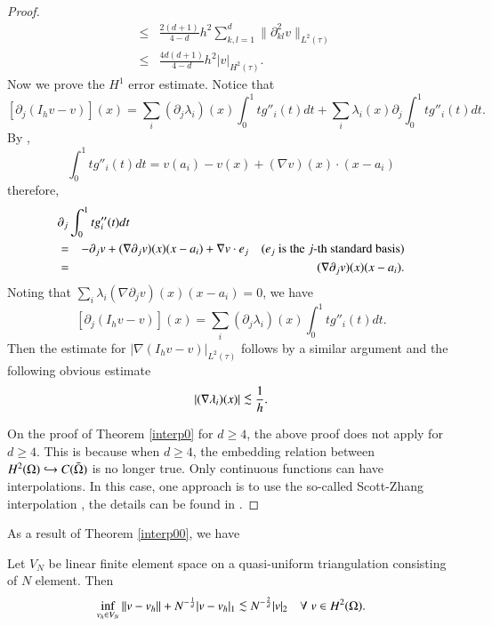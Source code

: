 \begin{proof}
\begin{eqnarray*}
&\le&\frac{2(d+1)}{4-d}h^2
\sum_{k,l=1}^d\|\partial^2_{kl}v\|_{L^2(\tau)}\\
&\le&\frac{4d(d+1)}{4-d}h^2|v|_{H^2(\tau)}.
\end{eqnarray*}
Now we prove the $H^1$ error estimate. Notice that
$$
[\partial_{j}( I_{h} v - v)](x) = \sum_{i} (\partial_{j} \lambda_{i} )(x) \int_{0}^{1} t g''_{i}(t) dt + \sum_{i} \lambda_{i}(x) \partial_{j} \int_{0}^{1} t g''_{i}(t) dt.
$$ 
By ,
$$
\int_0^1tg''_i(t)dt = v(a_i) - v(x) + (\nabla v)(x)\cdot (x-a_i)
$$
therefore,
\begin{eqnarray*}
\lefteqn{\partial_{j} \int_0^1tg''_i(t)dt} \\
& = & - \partial_{j} v + (\nabla \partial_{j} v )(x) (x - a_{i}) + \nabla v \cdot e_{j} 
\hcomment{$e_{j}$ is the $j$-th standard basis}  \\
& = & (\nabla \partial_{j} v )(x) (x - a_{i}).
\end{eqnarray*}
Noting that $\sum_{i} \lambda_{i}( \nabla \partial_{j} v )(x) (x - a_{i}) = 0$, we have
$$
[\partial_{j}( I_{h} v - v)](x) = \sum_{i} (\partial_{j} \lambda_{i} )(x) \int_{0}^{1} t g''_{i}(t) dt.
$$
Then the estimate for $|\nabla(I_hv-v)|_{L^2(\tau)}$
follows by a similar argument and the following obvious
estimate
$$
|(\nabla\lambda_i)(x)|\lc\frac{1}{h}.
$$
 
On the proof of Theorem \ref{interp0} for $d\ge 4$, the above proof does not
apply for $d \ge 4$. This is because when $d \ge 4$, the embedding
relation between $H^{2}(\Omega) \hookrightarrow C(\bar{\Omega})$ is no longer true.  Only
continuous functions can have interpolations. In this case, one approach is to use the 
so-called Scott-Zhang interpolation \cite{scott1990finite}, the
details can be found in \cite{Xu.J2015a}.
\end{proof}
As a result of Theorem \ref{interp00}, we have
\begin{theorem}\label{interp0}
Let $V_N$ be linear finite element space on a quasi-uniform
triangulation consisting of $N$ element.  Then 
\begin{equation}
\label{error0N}
\inf_{v_h\in V_N} \|v-v_h\|+N^{-{1\over d}} |v-v_h|_{1}\lc N^{-{2\over d}} |v|_2
        \qall v\in H^2(\Om).
\end{equation}
\end{theorem}



